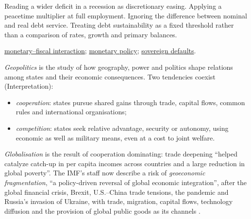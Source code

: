 \begin{qfdefinition}
 Reading a wider deficit in a recession as discretionary easing. Applying a peacetime multiplier at full employment. Ignoring the difference between nominal and real debt service. Treating debt sustainability as a fixed threshold rather than a comparison of rates, growth and primary balances.

 \hyperref[meth:monetary-fiscal-policy-mix]{monetary--fiscal interaction}; \hyperref[def:monetary-policy-transmission-regimes]{monetary policy}; \hyperref[def:sovereign-credit-defaults]{sovereign defaults}.

\end{qfdefinition}

\begin{qfdefinition}\label{def:geopolitics-institutions-tools}
 \emph{Geopolitics} is the study of how geography, power and politics shape relations among states and their economic consequences. Two tendencies coexist (Interpretation):
\begin{itemize}
\item \emph{cooperation}: states pursue shared gains through trade, capital flows, common rules and international organisations;
\item \emph{competition}: states seek relative advantage, security or autonomy, using economic as well as military means, even at a cost to joint welfare.
\end{itemize}
\emph{Globalisation} is the result of cooperation dominating: trade deepening ``helped catalyze catch-up in per capita incomes across countries and a large reduction in global poverty''. The IMF's staff now describe a risk of \emph{geoeconomic fragmentation}, ``a policy-driven reversal of global economic integration'', after the global financial crisis, Brexit, U.S.--China trade tensions, the pandemic and Russia's invasion of Ukraine, with trade, migration, capital flows, technology diffusion and the provision of global public goods as its channels \citep[Executive Summary, p.~4]{imf-sdn-2023-001}.


\end{qfdefinition}
